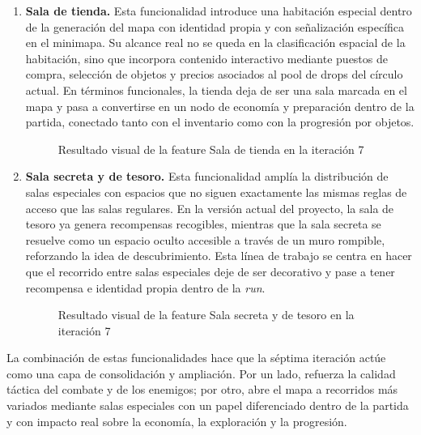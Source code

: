 \begin{enumerate}
\item \textbf{Sala de tienda.} Esta funcionalidad introduce una habitación especial dentro
de la generación del mapa con identidad propia y con señalización específica en el minimapa.
Su alcance real no se queda en la clasificación espacial de la habitación, sino que incorpora
contenido interactivo mediante puestos de compra, selección de objetos y precios asociados al
pool de drops del círculo actual. En términos funcionales, la tienda deja de ser una sala
marcada en el mapa y pasa a convertirse en un nodo de economía y preparación dentro de la
partida, conectado tanto con el inventario como con la progresión por objetos.

\begin{figure}[H]
\begin{center}
\caption{Resultado visual de la feature Sala de tienda en la iteración 7}
\label{fig:iteracion7-feature-tienda}
\end{center}
\end{figure}

\item \textbf{Sala secreta y de tesoro.} Esta funcionalidad amplía la distribución de salas
especiales con espacios que no siguen exactamente las mismas reglas de acceso que las salas
regulares. En la versión actual del proyecto, la sala de tesoro ya genera recompensas
recogibles, mientras que la sala secreta se resuelve como un espacio oculto accesible a
través de un muro rompible, reforzando la idea de descubrimiento. Esta línea de trabajo se
centra en hacer que el recorrido entre salas especiales deje de ser decorativo y pase a
tener recompensa e identidad propia dentro de la \textit{run}.

\begin{figure}[H]
\begin{center}
\caption{Resultado visual de la feature Sala secreta y de tesoro en la iteración 7}
\label{fig:iteracion7-feature-salas-especiales}
\end{center}
\end{figure}
\end{enumerate}

La combinación de estas funcionalidades hace que la séptima iteración actúe como una capa de
consolidación y ampliación. Por un lado, refuerza la calidad táctica del combate y de los
enemigos; por otro, abre el mapa a recorridos más variados mediante salas especiales con un
papel diferenciado dentro de la partida y con impacto real sobre la economía, la exploración
y la progresión.

